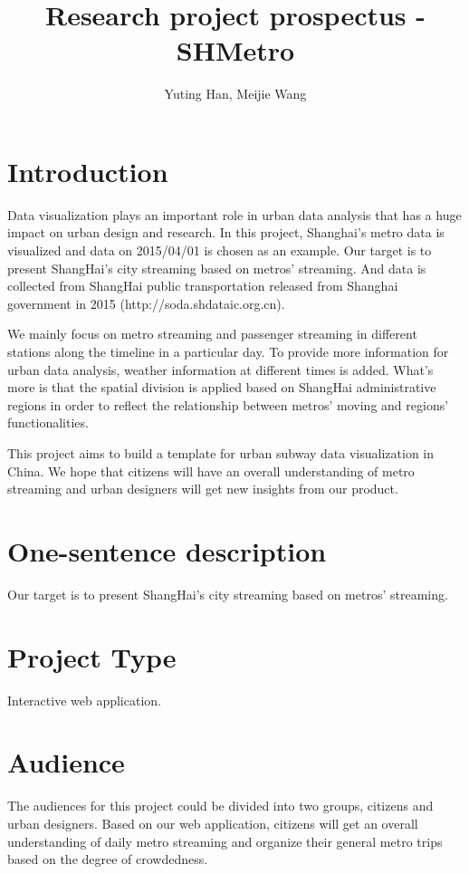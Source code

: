\documentclass{proc}
\begin{document}
\title{Research project prospectus - SHMetro}

\author{Yuting Han, Meijie Wang}

\maketitle

\section{Introduction}
Data visualization plays an important role in urban data analysis that has a huge impact on urban design and research. In this project, Shanghai’s metro data is visualized and data on 2015/04/01 is chosen as an example. Our target is to present ShangHai’s city streaming based on metros’ streaming. And data is collected from ShangHai public transportation released from Shanghai government in 2015 (http://soda.shdataic.org.cn).

We mainly focus on metro streaming and passenger streaming in different stations along the timeline in a particular day. To provide more information for urban data analysis, weather information at different times is added. What’s more is that the spatial division is applied based on ShangHai administrative regions in order to reflect the relationship between metros’ moving and regions’ functionalities.

This project aims to build a template for urban subway data visualization in China. We hope that citizens will have an overall understanding of metro streaming and urban designers will get new insights from our product.

\section{One-sentence description}
Our target is to present ShangHai’s city streaming based on metros’ streaming.

\section{Project Type}
Interactive web application.
\section{Audience} 
The audiences for this project could be divided into two groups, citizens and urban designers. Based on our web application, citizens will get an overall understanding of daily metro streaming and organize their general metro trips based on the degree of crowdedness.
\end{document}
